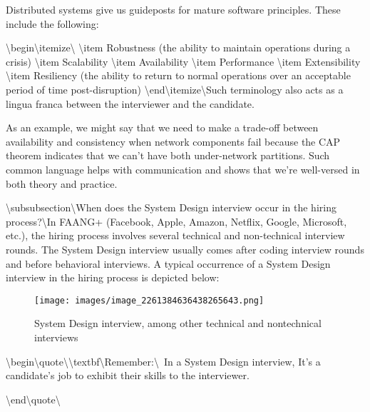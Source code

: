 Distributed systems give us guideposts for mature software principles. These include the following:

\textbackslash{}begin\textbackslash{}{itemize\textbackslash{}}
\textbackslash{}item Robustness (the ability to maintain operations during a crisis)
\textbackslash{}item Scalability
\textbackslash{}item Availability
\textbackslash{}item Performance
\textbackslash{}item Extensibility
\textbackslash{}item Resiliency (the ability to return to normal operations over an acceptable period of time post-disruption)
\textbackslash{}end\textbackslash{}{itemize\textbackslash{}}Such terminology also acts as a lingua franca between the interviewer and the candidate.

As an example, we might say that we need to make a trade-off between availability and consistency when network components fail because the CAP theorem indicates that we can’t have both under-network partitions. Such common language helps with communication and shows that we’re well-versed in both theory and practice.

\textbackslash{}subsubsection\textbackslash{}{When does the System Design interview occur in the hiring process?\textbackslash{}}In FAANG+ (Facebook, Apple, Amazon, Netflix, Google, Microsoft, etc.), the hiring process involves several technical and non-technical interview rounds. The System Design interview usually comes after coding interview rounds and before behavioral interviews. A typical occurrence of a System Design interview in the hiring process is depicted below:

\begin{figure}[htbp]
    \centering
    \texttt{[image: images/image\_2261384636438265643.png]}
    \caption{System Design interview, among other technical and nontechnical interviews}
\end{figure}

\textbackslash{}begin\textbackslash{}{quote\textbackslash{}}\textbackslash{}textbf\textbackslash{}{Remember:\textbackslash{}} In a System Design interview, It’s a candidate’s job to exhibit their skills to the interviewer.

\textbackslash{}end\textbackslash{}{quote\textbackslash{}}

